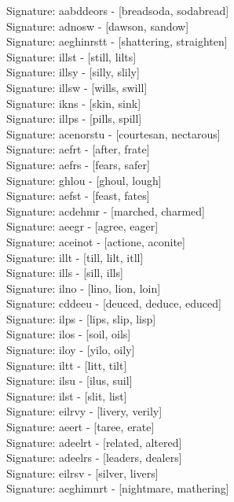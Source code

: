 Signature: {aabddeors} - [breadsoda, sodabread] \\
Signature: {adnosw} - [dawson, sandow] \\
Signature: {aeghinrstt} - [shattering, straighten] \\
Signature: {illst} - [still, lilts] \\
Signature: {illsy} - [silly, slily] \\
Signature: {illsw} - [wills, swill] \\
Signature: {ikns} - [skin, sink] \\
Signature: {illps} - [pills, spill] \\
Signature: {acenorstu} - [courtesan, nectarous] \\
Signature: {aefrt} - [after, frate] \\
Signature: {aefrs} - [fears, safer] \\
Signature: {ghlou} - [ghoul, lough] \\
Signature: {aefst} - [feast, fates] \\
Signature: {acdehmr} - [marched, charmed] \\
Signature: {aeegr} - [agree, eager] \\
Signature: {aceinot} - [actione, aconite] \\
Signature: {illt} - [till, lilt, itll] \\
Signature: {ills} - [sill, ills] \\
Signature: {ilno} - [lino, lion, loin] \\
Signature: {cddeeu} - [deuced, deduce, educed] \\
Signature: {ilps} - [lips, slip, lisp] \\
Signature: {ilos} - [soil, oils] \\
Signature: {iloy} - [yilo, oily] \\
Signature: {iltt} - [litt, tilt] \\
Signature: {ilsu} - [ilus, suil] \\
Signature: {ilst} - [slit, list] \\
Signature: {eilrvy} - [livery, verily] \\
Signature: {aeert} - [taree, erate] \\
Signature: {adeelrt} - [related, altered] \\
Signature: {adeelrs} - [leaders, dealers] \\
Signature: {eilrsv} - [silver, livers] \\
Signature: {aeghimnrt} - [nightmare, mathering] \\
